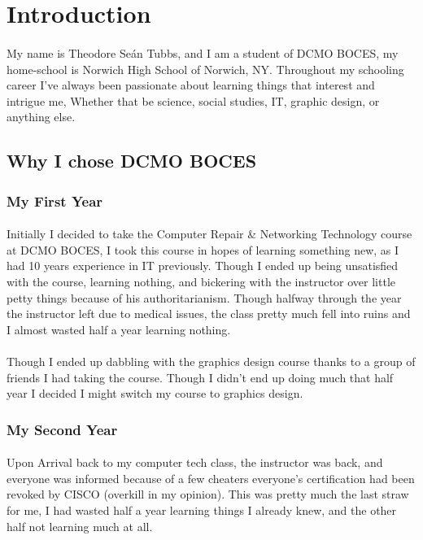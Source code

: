 \section{Introduction}
\paragraph{}
My name is Theodore Se\'{a}n Tubbs, and I am a student of DCMO BOCES, my
home-school is Norwich High School of Norwich, NY. Throughout my schooling
career I've always been passionate about learning things that interest and
intrigue me, Whether that be science, social studies, IT, graphic design, or
anything else.

\subsection{Why I chose DCMO BOCES}

\subsubsection{My First Year}
\paragraph{}
Initially I decided to take the Computer Repair \& Networking Technology course
at DCMO BOCES, I took this course in hopes of learning something new, as I had
10 years experience in IT previously. Though I ended up being unsatisfied with
the course, learning nothing, and bickering with the instructor over little petty
things because of his authoritarianism. Though halfway through the year the
instructor left due to medical issues, the class pretty much fell into ruins
and I almost wasted half a year learning nothing.

\paragraph{}
Though I ended up dabbling with the graphics design course thanks to a group of
friends I had taking the course. Though I didn't end up doing much that half
year I decided I might switch my course to graphics design.

\subsubsection{My Second Year}
\paragraph{}
Upon Arrival back to my computer tech class, the instructor was back, and
everyone was informed because of a few cheaters everyone's certification had
been revoked by CISCO (overkill in my opinion). This was pretty much the last
straw for me, I had wasted half a year learning things I already knew, and the
other half not learning much at all.

